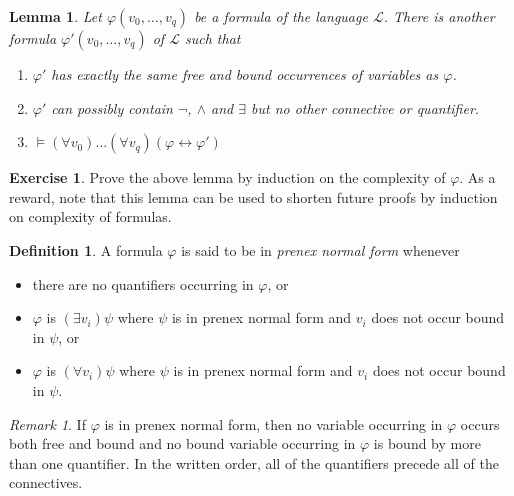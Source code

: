 \documentclass[titlepage, oneside]{amsbook}
\theoremstyle{plain}
\newtheorem{lemma}{Lemma}
\theoremstyle{definition}
\newtheorem{exercise}{Exercise}
\newtheorem{definition}{Definition}
\theoremstyle{remark}
\newtheorem*{rem}{Remark}
\begin{document}
\begin{lemma}\label{L:altform} Let $\varphi(v_{0}, \dots ,v_{q})$ be a
formula
of the 
language $\mathcal{L}$. There is another formula $\varphi' (v_{0}, 
\dots ,v_{q})$ of $\mathcal{L}$ such that

\begin{enumerate}

\item $\varphi'$ has exactly the same free and bound occurrences of 
variables as $\varphi$.


\item $\varphi'$ can possibly contain $\neg$, 
$\wedge$ and 
$\exists$ but no other connective or quantifier.

\item $\models ( \forall v_{0}) \dots  (\forall
v_{q}) (\varphi
\leftrightarrow \varphi' )$
\end{enumerate}

\end{lemma}


\begin{exercise} Prove the above lemma by induction on the complexity
of $\varphi$. As a reward, note that this lemma can be used to shorten future proofs by induction on complexity of formulas.
\end{exercise}


\begin{definition}
%
 A formula $\varphi $ is said to be in
\emph{prenex
normal form} whenever 
\begin{itemize}
\item[(1)] there are no quantifiers occurring in $\varphi $, or 
\item[(2)] $\varphi $ is $(\exists v_{i}) \psi$ where $\psi$ is in prenex normal 
form and $v_{i}$ does not occur bound in $\psi$, or
\item[(3)] $\varphi $ is $(\forall v_{i}) \psi$ where $\psi$ is in prenex normal 
form and $v_{i}$ does not occur bound in $\psi$.
\end{itemize}
\end{definition}

\begin{rem}
If $\varphi $ is in prenex normal form, then no variable occurring in $\varphi $ occurs both free and bound and no bound variable occurring in $\varphi $ is bound by more than one quantifier.
In the written order, all of the quantifiers precede all of the connectives.
\end{rem}
\end{document}
